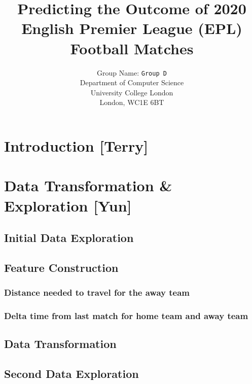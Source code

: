 \documentclass{article}
\title{Predicting the Outcome of 2020 English Premier League (EPL) Football Matches}
\author{
 Group Name: \texttt{Group D}\\
  Department of Computer Science\\
  University College London\\
  London, WC1E 6BT\\
}
\begin{document}
\maketitle


\section{Introduction [Terry] }


\section{Data Transformation \& Exploration [Yun]}

\subsection{Initial Data Exploration}


\subsection{Feature Construction}

\subsubsection{Distance needed to travel for the away team}

\subsubsection{Delta time from last match for home team and away team}


\subsection{Data Transformation }


\subsection{Second Data Exploration}
\end{document}
